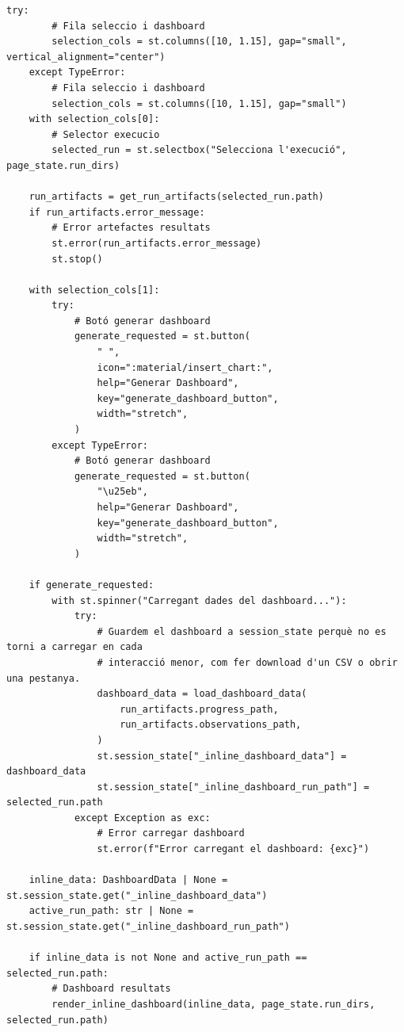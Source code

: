 \documentclass[10pt,a4paper]{article}
\begin{document}
\begin{lstlisting}[style=studioPython,caption={pages/Resultats.py},label={lst:pages-resultats-py}]
    try:
        # Fila seleccio i dashboard
        selection_cols = st.columns([10, 1.15], gap="small", vertical_alignment="center")
    except TypeError:
        # Fila seleccio i dashboard
        selection_cols = st.columns([10, 1.15], gap="small")
    with selection_cols[0]:
        # Selector execucio
        selected_run = st.selectbox("Selecciona l'execució", page_state.run_dirs)

    run_artifacts = get_run_artifacts(selected_run.path)
    if run_artifacts.error_message:
        # Error artefactes resultats
        st.error(run_artifacts.error_message)
        st.stop()

    with selection_cols[1]:
        try:
            # Botó generar dashboard
            generate_requested = st.button(
                " ",
                icon=":material/insert_chart:",
                help="Generar Dashboard",
                key="generate_dashboard_button",
                width="stretch",
            )
        except TypeError:
            # Botó generar dashboard
            generate_requested = st.button(
                "\u25eb",
                help="Generar Dashboard",
                key="generate_dashboard_button",
                width="stretch",
            )

    if generate_requested:
        with st.spinner("Carregant dades del dashboard..."):
            try:
                # Guardem el dashboard a session_state perquè no es torni a carregar en cada
                # interacció menor, com fer download d'un CSV o obrir una pestanya.
                dashboard_data = load_dashboard_data(
                    run_artifacts.progress_path,
                    run_artifacts.observations_path,
                )
                st.session_state["_inline_dashboard_data"] = dashboard_data
                st.session_state["_inline_dashboard_run_path"] = selected_run.path
            except Exception as exc:
                # Error carregar dashboard
                st.error(f"Error carregant el dashboard: {exc}")

    inline_data: DashboardData | None = st.session_state.get("_inline_dashboard_data")
    active_run_path: str | None = st.session_state.get("_inline_dashboard_run_path")

    if inline_data is not None and active_run_path == selected_run.path:
        # Dashboard resultats
        render_inline_dashboard(inline_data, page_state.run_dirs, selected_run.path)


\end{lstlisting}
\end{document}
